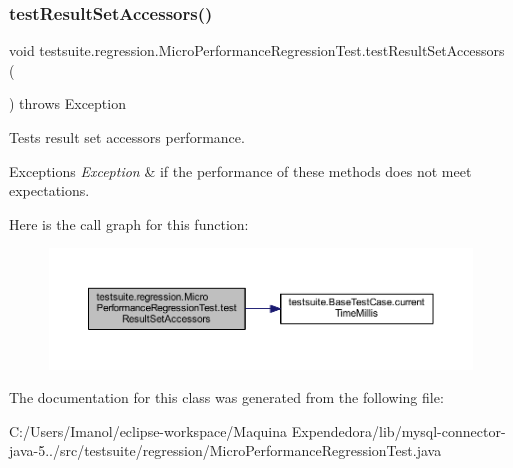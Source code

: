 \subsubsection{\texorpdfstring{test\+Result\+Set\+Accessors()}{testResultSetAccessors()}}
{\footnotesize\ttfamily void testsuite.\+regression.\+Micro\+Performance\+Regression\+Test.\+test\+Result\+Set\+Accessors (\begin{DoxyParamCaption}{ }\end{DoxyParamCaption}) throws Exception}

Tests result set accessors performance.


\begin{DoxyExceptions}{Exceptions}
{\em Exception} & if the performance of these methods does not meet expectations. \\
\hline
\end{DoxyExceptions}
Here is the call graph for this function\+:
\nopagebreak
\begin{figure}[H]
\begin{center}
\leavevmode
\includegraphics[width=350pt]{classtestsuite_1_1regression_1_1_micro_performance_regression_test_a1fa02a07cb865e21f5debd2b6cf58782_cgraph}
\end{center}
\end{figure}


The documentation for this class was generated from the following file\+:\begin{DoxyCompactItemize}
\item 
C\+:/\+Users/\+Imanol/eclipse-\/workspace/\+Maquina Expendedora/lib/mysql-\/connector-\/java-\/5../src/testsuite/regression/Micro\+Performance\+Regression\+Test.\+java\end{DoxyCompactItemize}
